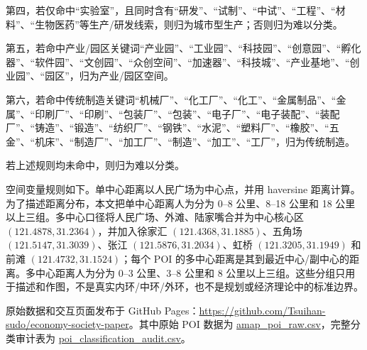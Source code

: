 \documentclass[aps,prl,reprint,superscriptaddress,floatfix,nofootinbib,longbibliography,amsmath,amssymb]{revtex4-2}
\newcommand{\DataPageUrl}{https://github.com/Tsuihan-sudo/economy-society-paper}
\newcommand{\RawPoiDataUrl}{https://github.com/Tsuihan-sudo/economy-society-paper/data/amap_poi_raw.csv}
\newcommand{\AuditDataUrl}{https://github.com/Tsuihan-sudo/economy-society-paper/data/poi_classification_audit.csv}
\begin{document}
第四，若仅命中``实验室''，且同时含有``研发''、``试制''、``中试''、``工程''、``材料''、``生物医药''等生产/研发线索，则归为城市型生产；否则归为难以分类。

第五，若命中产业/园区关键词``产业园''、``工业园''、``科技园''、``创意园''、``孵化器''、``软件园''、``文创园''、``众创空间''、``加速器''、``科技城''、``产业基地''、``创业园''、``园区''，归为产业/园区空间。

第六，若命中传统制造关键词``机械厂''、``化工厂''、``化工''、``金属制品''、``金属''、``印刷厂''、``印刷''、``包装厂''、``包装''、``电子厂''、``电子装配''、``装配厂''、``铸造''、``锻造''、``纺织厂''、``钢铁''、``水泥''、``塑料厂''、``橡胶''、``五金''、``机床''、``制造厂''、``加工厂''、``制造''、``加工''、``工厂''，归为传统制造。

若上述规则均未命中，则归为难以分类。

空间变量规则如下。单中心距离以人民广场为中心点，并用 haversine 距离计算。为了描述距离分布，本文把单中心距离人为分为 0--8 公里、8--18 公里和 18 公里以上三组。多中心口径将人民广场、外滩、陆家嘴合并为中心核心区 $(121.4878,31.2364)$，并加入徐家汇 $(121.4368,31.1885)$、五角场 $(121.5147,31.3039)$、张江 $(121.5876,31.2034)$、虹桥 $(121.3205,31.1949)$ 和前滩 $(121.4732,31.1524)$；每个 POI 的多中心距离是其到最近中心/副中心的距离。多中心距离人为分为 0--3 公里、3--8 公里和 8 公里以上三组。这些分组只用于描述和作图，不是真实内环/中环/外环，也不是规划或经济理论中的标准边界。

原始数据和交互页面发布于 GitHub Pages：\href{\DataPageUrl}{\DataPageUrl}。其中原始 POI 数据为 \href{\RawPoiDataUrl}{amap\_poi\_raw.csv}，完整分类审计表为 \href{\AuditDataUrl}{poi\_classification\_audit.csv}。
\end{document}
